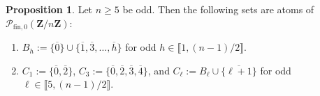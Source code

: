 \documentclass{report}
\newcommand{\llb}{\llbracket}
\newcommand{\rrb}{\rrbracket}
\newcommand{\fin}{\textrm{fin}}
\renewcommand{\:}{\text{:}}
\theoremstyle{definition}
\newtheorem{prop}[defn]{Proposition}
\begin{document}
\begin{prop}\label{large-atom-construction}
	Let $n\ge 5$ be odd.
	Then the following sets are atoms of $\mathcal P_{\fin,0}(\mathbf Z/n\mathbf Z)$:
	\begin{enumerate}[label={\rm (\roman{*})}]
		\item\label{it:large-atom-construction(i)} $B_h := \bigl\{\overline{0}\} \cup \{\overline{1},\overline{3},\dots, \overline{h}\bigr\}$ for odd $h\in \llb 1,(n-1)/2 \rrb$.
		\item\label{it:large-atom-construction(ii)} $C_1 := \bigl\{\overline{0}, \overline{2}\bigr\}$, $C_3 := \bigl\{\overline{0},\overline{2},\overline{3},\overline{4}\bigr\}$, and $C_\ell := B_\ell\cup\bigl\{\overline{\ell+1}\bigr\}$ for odd $\ell\in \llb 5, (n-1)/2 \rrb$.
	\end{enumerate}
\end{prop}
\end{document}
